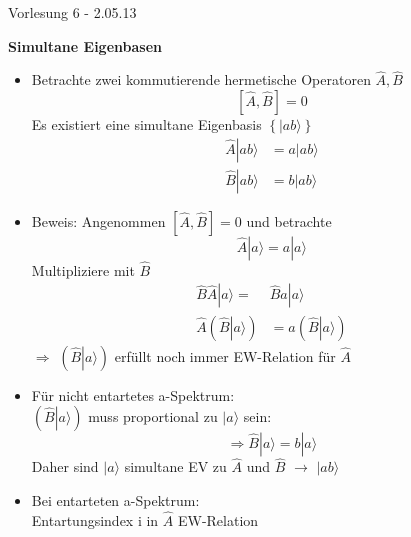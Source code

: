 \documentclass[10pt,article,colorback,accentcolor=tud9d]{scrartcl}
\begin{document}
\begin{flushright}
Vorlesung 6 - 2.05.13
\end{flushright}
\textbf{Simultane Eigenbasen}
  \begin{itemize}
    \item Betrachte zwei kommutierende hermetische Operatoren $\hat{A},\hat{B}$
      \begin{equation}
        \left[\hat{A},\hat{B}\right]=0
      \end{equation}
      Es existiert eine simultane Eigenbasis $\left\{\left.\right|ab\rangle\right\}$
      \begin{equation}
      \begin{aligned}
      \hat{A}\left.\right|ab\rangle&=a\left.\right|ab\rangle\\
      \hat{B}\left.\right|ab\rangle&=b\left.\right|ab\rangle
      \end{aligned}
      \end{equation}
    \item Beweis: Angenommen $\left[\hat{A},\hat{B}\right]=0$ und betrachte 
      \begin{equation}
      \hat{A}\left.\right|a\rangle=a\left.\right|a\rangle
      \end{equation}
      Multipliziere mit $\hat{B}$
      \begin{equation}
      \begin{aligned}
      \hat{B}\hat{A}\left.\right|a\rangle=&\hat{B}a\left.\right|a\rangle\\
      \hat{A}\left(\hat{B}\left.\right|a\rangle\right)&=a\left(\hat{B}\left.\right|a\rangle\right)
      \end{aligned}
      \end{equation}
        $\Rightarrow$ $\left(\hat{B}\left.\right|a\rangle\right)$ erfüllt noch immer EW-Relation für $\hat{A}$
    \item Für nicht entartetes a-Spektrum:\\
      $\left(\hat{B}\left.\right|a\rangle\right)$ muss proportional zu $\left.\right|a\rangle$ sein:
      \begin{equation}
      \Rightarrow \hat{B}\left.\right|a\rangle=b\left.\right|a\rangle
      \end{equation}
      Daher sind $\left.\right|a\rangle$ simultane EV zu $\hat{A}$ und $\hat{B}$ $\rightarrow$ $\left.\right|ab\rangle$
    \item Bei entarteten a-Spektrum:\\
      Entartungsindex i in $\hat{A}$ EW-Relation

\end{itemize}
\end{document}
